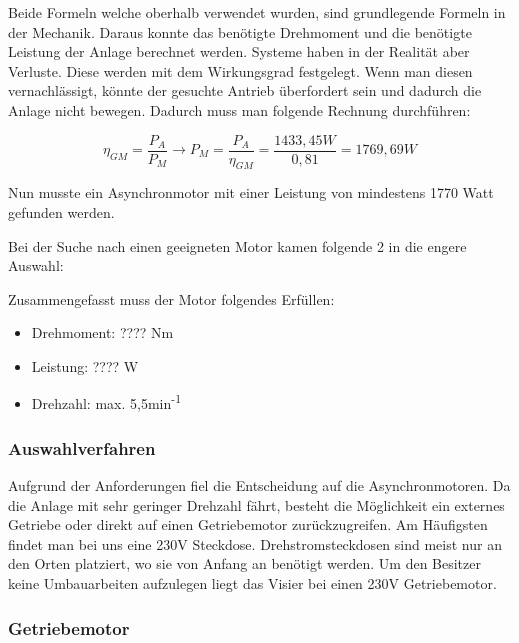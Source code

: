 \documentclass[12pt]{scrreprt} %
\begin{document}
Beide Formeln welche oberhalb verwendet wurden, sind grundlegende Formeln in der Mechanik. Daraus konnte das benötigte Drehmoment und die benötigte Leistung der Anlage berechnet werden. Systeme haben in der Realität aber Verluste. Diese werden mit dem Wirkungsgrad festgelegt. Wenn man diesen vernachlässigt, könnte der gesuchte Antrieb überfordert sein und dadurch die Anlage nicht bewegen. Dadurch muss man folgende Rechnung durchführen:

\begin{center}
\begin{equation}
  \label{eq:4}
	\eta_{GM}= \frac{P_{A}}{P_{M}} \rightarrow P_{M} = \frac{P_{A}}{\eta_{GM}} = \frac{1433,45W}{0,81} = 1769,69W
\end{equation} 
\end{center}

Nun musste ein Asynchronmotor mit einer Leistung von mindestens 1770 Watt gefunden werden.

Bei der Suche nach einen geeigneten Motor kamen folgende 2 in die engere Auswahl:


Zusammengefasst muss der Motor folgendes Erfüllen:

\begin{itemize}
\item{Drehmoment: ???? Nm}
\item{Leistung: ???? W}
\item{Drehzahl: max. 5,5min\textsuperscript{-1}}
\end{itemize}

\subsubsection{Auswahlverfahren}
\label{sec:auswahlverfahren}

Aufgrund der Anforderungen fiel die Entscheidung auf die Asynchronmotoren. Da die Anlage mit sehr geringer Drehzahl fährt, besteht die Möglichkeit ein externes Getriebe oder direkt auf einen Getriebemotor zurückzugreifen. 
Am Häufigsten findet man bei uns eine 230V Steckdose. Drehstromsteckdosen sind meist nur an den Orten platziert, wo sie von Anfang an benötigt werden. Um den Besitzer keine Umbauarbeiten aufzulegen liegt das Visier bei einen 230V Getriebemotor.

\subsubsection{Getriebemotor}
\label{sec:getriebemotor}
\end{document}
